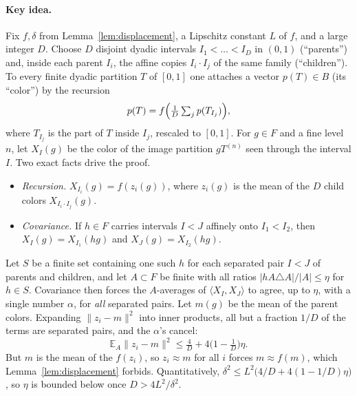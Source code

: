 \documentclass[11pt]{article}
\newcommand{\norm}[1]{\lVert #1\rVert}
\newcommand{\ip}[2]{\langle #1,#2\rangle}
\newcommand{\EA}{\mathbb E_A}
\theoremstyle{definition}
\numberwithin{equation}{section}
\begin{document}
\paragraph{Key idea.}
Fix \(f,\delta\) from Lemma~\ref{lem:displacement}, a Lipschitz constant
\(L\) of \(f\), and a large integer \(D\). Choose \(D\) disjoint dyadic
intervals \(I_1<\dots<I_D\) in \((0,1)\) (``parents'') and, inside each
parent \(I_i\), the affine copies \(I_i\cdot I_j\) of the same family
(``children''). To every finite dyadic partition \(T\) of \([0,1]\) one
attaches a vector \(p(T)\in B\) (its ``color'') by the recursion
\[
  p(T)=f\Bigl(\tfrac1D\textstyle\sum_{j}p(T_{I_j})\Bigr),
\]
where \(T_{I_j}\) is the part of \(T\) inside \(I_j\), rescaled to
\([0,1]\). For \(g\in F\) and a fine level \(n\), let \(X_I(g)\) be the
color of the image partition \(gT^{(n)}\) seen through the interval \(I\).
Two exact facts drive the proof.
\begin{itemize}
\item \emph{Recursion.} \(X_{I_i}(g)=f(z_i(g))\), where \(z_i(g)\) is the
mean of the \(D\) child colors \(X_{I_i\cdot I_j}(g)\).
\item \emph{Covariance.} If \(h\in F\) carries intervals \(I<J\) affinely
onto \(I_1<I_2\), then \(X_I(g)=X_{I_1}(hg)\) and \(X_J(g)=X_{I_2}(hg)\).
\end{itemize}
Let \(S\) be a finite set containing one such \(h\) for each separated
pair \(I<J\) of parents and children, and let \(A\subset F\) be finite
with all ratios \(|hA\triangle A|/|A|\le\eta\) for \(h\in S\). Covariance
then forces the \(A\)-averages of \(\ip{X_I}{X_J}\) to agree, up to
\(\eta\), with a single number \(\alpha\), for \emph{all} separated pairs.
Let \(m(g)\) be the mean of the parent colors. Expanding
\(\norm{z_i-m}^2\) into inner products, all but a fraction \(1/D\) of the
terms are separated pairs, and the \(\alpha\)'s cancel:
\[
  \EA\norm{z_i-m}^2\le \tfrac4D+4\bigl(1-\tfrac1D\bigr)\eta .
\]
But \(m\) is the mean of the \(f(z_i)\), so \(z_i\approx m\) for all \(i\)
forces \(m\approx f(m)\), which Lemma~\ref{lem:displacement} forbids.
Quantitatively, \(\delta^2\le L^2\bigl(4/D+4(1-1/D)\eta\bigr)\), so \(\eta\)
is bounded below once \(D>4L^2/\delta^2\).
\end{document}
